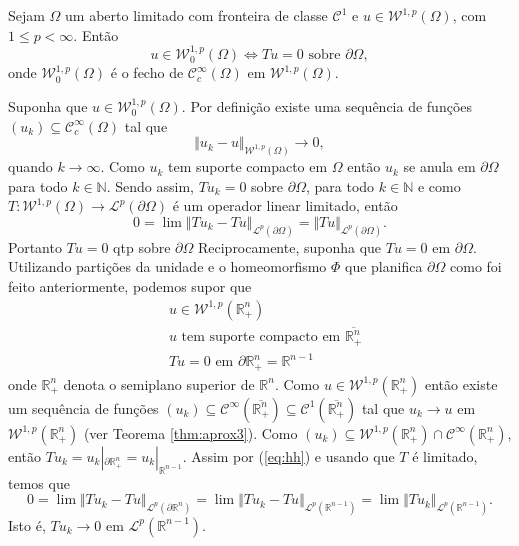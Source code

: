 \documentclass[a4paper, 11pt]{book}
\theoremstyle{definition}
\newcommand{\bN}{\mathbb{N}}
\newcommand{\bR}{\mathbb{R}}
\newcommand{\cC}{\mathcal{C}}
\newcommand{\cL}{\mathcal{L}}
\newcommand{\cW}{\mathcal{W}}
\begin{document}
\begin{tbox}[Funções traço zero em $\cW^{1,p}$] \label{thm:traco-2}
    Sejam $\Omega$ um aberto limitado com fronteira de classe $\cC^1$ e $u \in \cW^{1,p}(\Omega)$, com $1 \leqslant p < \infty$. Então
    \[
        u \in \cW_0^{1,p}(\Omega) \iff Tu = 0 \text{ sobre } \partial \Omega,
    \]
    onde $\cW_0^{1,p}(\Omega)$ é o fecho de $\cC^{\infty}_c(\Omega)$ em $\cW^{1,p}(\Omega)$.
\end{tbox}
\begin{prf}
    Suponha que $u \in \cW_0^{1,p}(\Omega)$. Por definição existe uma sequência de funções $(u_k) \subseteq \cC^{\infty}_c(\Omega)$ tal que
    \[
        \Vert u_k - u \Vert_{\cW^{1,p}(\Omega)} \to 0,
    \]
    quando $k \to \infty$. Como $u_k$ tem suporte compacto em $\Omega$ então $u_k$ se anula em $\partial \Omega$ para todo $k \in \bN$. Sendo assim, $Tu_k = 0$ sobre $\partial\Omega$, para todo $k \in \bN$ e como $T : \cW^{1,p}(\Omega) \to \cL^p(\partial \Omega)$ é um operador linear limitado, então
    \[
        0 = \lim \Vert Tu_k - Tu \Vert_{\cL^p(\partial \Omega)} = \Vert Tu \Vert_{\cL^p(\partial \Omega)}.
    \]
    Portanto $Tu =0$ qtp sobre $\partial \Omega$
    Reciprocamente, suponha que $Tu = 0$ em $\partial \Omega$. Utilizando partições da unidade e o homeomorfismo $\Phi$ que planifica $\partial \Omega$ como foi feito anteriormente, podemos supor que
    \begin{equation} \label{eq:hh}
        \begin{aligned}
            &u \in \cW^{1,p}(\bR^n_+)\\
            &u \text{ tem suporte compacto em } \overline{\bR^n_+}\\
            &Tu = 0 \text{ em } \partial \bR^n_+ = \bR^{n-1}
        \end{aligned}
    \end{equation}
    onde $\bR^n_+$ denota o semiplano superior de $\bR^n$.
    Como $u \in \cW^{1,p}(\bR^n_+)$ então existe um sequência de funções $(u_k) \subseteq \cC^{\infty}(\overline{\bR^n_+}) \subseteq \cC^1(\overline{\bR^n_+})$ tal que $u_k \to u$ em $\cW^{1,p}(\bR^n_+)$ (ver Teorema \ref{thm:aprox3}). Como $(u_k) \subseteq \cW^{1,p}(\bR^n_+) \cap \cC^\infty(\bR^n_+)$, então $T u_k = u_k |_{\partial \bR^n_+} = u_k |_{\bR^{n-1}}$.
    Assim por (\ref{eq:hh}) e usando que $T$ é limitado, temos que
    \[
        0 = \lim \Vert Tu_k - Tu \Vert_{\cL^p(\partial \bR^n)} = \lim \Vert Tu_k - Tu \Vert_{\cL^p(\bR^{n-1})} = \lim \Vert Tu_k \Vert_{\cL^p(\bR^{n-1})}.
    \]
    Isto é, $T u_k \to 0$ em $\cL^p(\bR^{n-1})$.


\end{prf}
\end{document}
